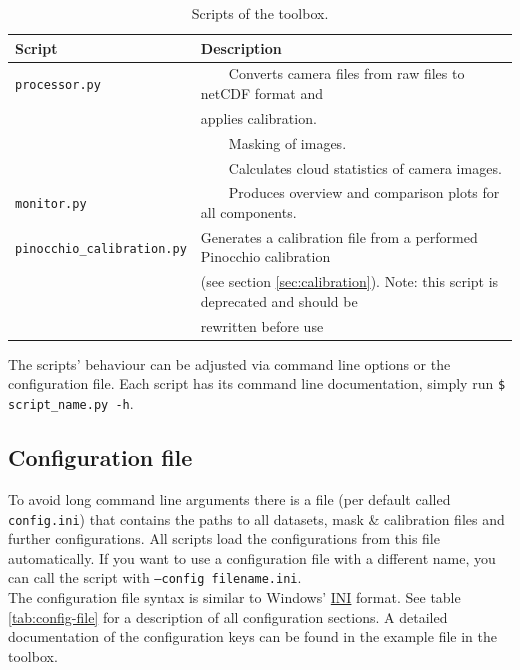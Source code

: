 \documentclass[11pt,a4paper]{article}
\newcommand{\tabitem}{~~\llap{\textbullet}~~}
\begin{document}
\begin{table}[h!]
	\centering
	\caption{Scripts of the \cloud toolbox.}
	\begin{tabular}{|l|l|}
	\hline 
	\textbf{Script} & \textbf{Description}\\ 
	\hline \hline 
	\texttt{processor.py} & \tabitem Converts camera files from raw files to netCDF format and\\ 
	& applies calibration.\\
	& \tabitem Masking of images.\\
	& \tabitem Calculates cloud statistics of camera images.\\ 
	\hline 
	\texttt{monitor.py} & \tabitem Produces overview and comparison plots for all components.\\ 
	\hline 
	\texttt{pinocchio\_calibration.py} &  Generates a calibration file from a performed Pinocchio calibration\\
	& (see section \ref{sec:calibration}). Note: this script is deprecated and should be\\
	& rewritten before use\\
	\hline
	\end{tabular} 
\end{table}

The scripts' behaviour can be adjusted via command line options or the configuration file. Each script has its command line documentation, simply run \texttt{\$ script\_name.py -h}.

\subsection{Configuration file}
To avoid long command line arguments there is a file (per default called \texttt{config.ini}) that contains the paths to all datasets, mask \& calibration files and further configurations. All scripts load the configurations from this file automatically. If you want to use a configuration file with a different name, you can call the script with \texttt{--config filename.ini}.\\

The configuration file syntax is similar to Windows' \href{https://en.wikipedia.org/wiki/INI_file}{INI} format. See table \ref{tab:config-file} for a description of all configuration sections. A detailed documentation of the configuration keys can be found in the example file in the \cloud toolbox.\\
\end{document}
